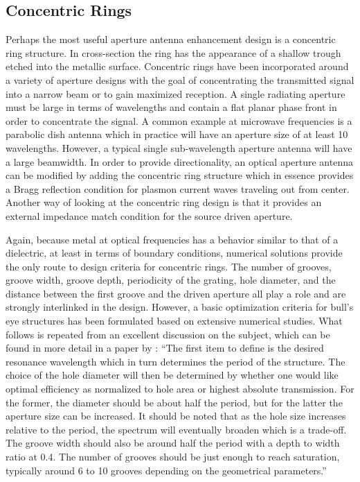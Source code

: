 \subsection{Concentric Rings}
%
Perhaps the most useful aperture antenna enhancement design is a concentric ring structure. In cross-section the ring has the appearance of a shallow trough etched into the metallic surface. Concentric rings have been incorporated around a variety of aperture designs with the goal of concentrating the transmitted signal into a narrow beam or to gain maximized reception. A single radiating aperture must be large in terms of wavelengths and contain a flat planar phase front in order to concentrate the signal. A common example at microwave frequencies is a parabolic dish antenna which in practice will have an aperture size of at least 10 wavelengths. However, a typical single sub-wavelength aperture antenna will have a large beamwidth. In order to provide directionality, an optical aperture antenna can be modified by adding the concentric ring structure which in essence provides a Bragg reflection condition for plasmon current waves traveling out from center. Another way of looking at the concentric ring design is that it provides an external impedance match condition for the source driven aperture.

Again, because metal at optical frequencies has a behavior similar to that of a dielectric, at least in terms of boundary conditions, numerical solutions provide the only route to design criteria for concentric rings. The number of grooves, groove width, groove depth, periodicity of the grating, hole diameter, and the distance between the first groove and the driven aperture all play a role and are strongly interlinked in the design. However, a basic optimization criteria for bull's eye structures has been formulated based on extensive numerical studies. What follows is repeated from an excellent discussion on the subject, which can be found in more detail in a paper by \cite{Mahboub2010}: ``The first item to define is the desired resonance wavelength which in turn determines the period of the structure. The choice of the hole diameter will then be determined by whether one would like optimal efficiency as normalized to hole area or highest absolute transmission. For the former, the diameter should be about half the period, but for the latter the aperture size can be increased. It should be noted that as the hole size increases relative to the period, the spectrum will eventually broaden which is a trade-off. The groove width should also be around half the period with a depth to width ratio at 0.4. The number of grooves should be just enough to reach saturation, typically around 6 to 10 grooves depending on the geometrical parameters.''

